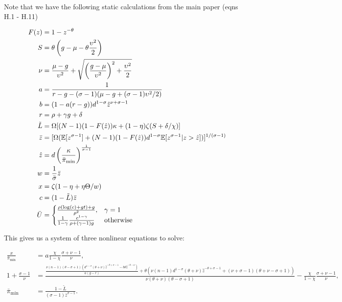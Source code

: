 \documentclass[11pt]{article}
\begin{document}
Note that we have the following static calculations from the main paper (eqns H.1 - H.11)

\begin{align}
	F(z) &= 1 - z^{-\theta} \\
	S &= \theta \left(g - \mu - \theta \frac{\upsilon^2}{2}\right) \\
	\nu &= \frac{\mu - g}{\upsilon^2} + \sqrt{\left(\frac{g - \mu}{\upsilon^2}\right)^2 + \frac{\upsilon^2}{2}} \\
	a &= \frac{1}{r - g - (\sigma - 1)(\mu - g  + (\sigma - 1)\upsilon^2/2)} \\
	b &= (1 - a(r-g))d^{1-\sigma}\hat{z}^{\nu + \sigma -1} \\
	r &= \rho + \gamma g + \delta \\
	\tilde{L} &= \Omega [(N-1)(1 - F(\hat{z}))\kappa + (1-\eta)\zeta(S + \delta/\chi)] \\
	\bar{z} &= [\Omega(\mathbb{E}[z^{\sigma - 1}] + (N-1)(1 - F(\hat{z}))d^{1 - \sigma}\mathbb{E}[z^{\sigma - 1}|z > \hat{z}])]^{1/(\sigma - 1)} \\
	\hat{z} &= d \left(\frac{\kappa}{\bar{\pi}_{\textup{min}}}\right)^{\frac{1}{\sigma - 1}} \\
	w &= \frac{1}{\bar{\sigma}}\bar{z} \\
	x &= \zeta(1 - \eta + \eta \Theta / w) \\
		c &= (1 - \tilde{L})\bar{z} \\
		\bar{U} &=
	\begin{cases}
	\frac{\rho (\log(c) + gt ) + g}{\rho^2}, & \gamma = 1 \\
	\frac{1}{1-\gamma} \frac{c^{1 - \gamma}}{\rho + (\gamma - 1)g} & \text{otherwise}
	\end{cases}
\end{align}

This gives us a system of three nonlinear equations to solve:

		\begin{align}
		\frac{x}{\bar{\pi}_{\min}} &=  a \frac{\chi}{1-\chi}\frac{\sigma + \nu - 1}{\nu} , \\
		1 + \frac{\sigma - 1}{\nu} &= {\scriptstyle \frac{\frac{\nu  (n-1) (\theta -\sigma +1) \left(d^{1-\sigma } (\theta +\nu ) \hat{z}^{-\theta +\sigma -1}-b \theta  \hat{z}^{-\theta -\nu }\right)}{a (g-r)}+\theta  \left(\nu  (n-1) d^{1-\sigma } (\theta +\nu ) \hat{z}^{-\theta +\sigma -1}+(\nu +\sigma -1) (\theta +\nu -\sigma +1)\right)}{\nu  (\theta +\nu ) (\theta -\sigma +1)} -  \frac{\chi}{1-\chi}\frac{\sigma + \nu - 1}{\nu}} , \\
		\bar{\pi}_{\min} &= \tfrac{1 - \tilde{L}}{(\sigma - 1) \bar{z}^{\sigma - 1}}.
		\end{align}
\end{document}
